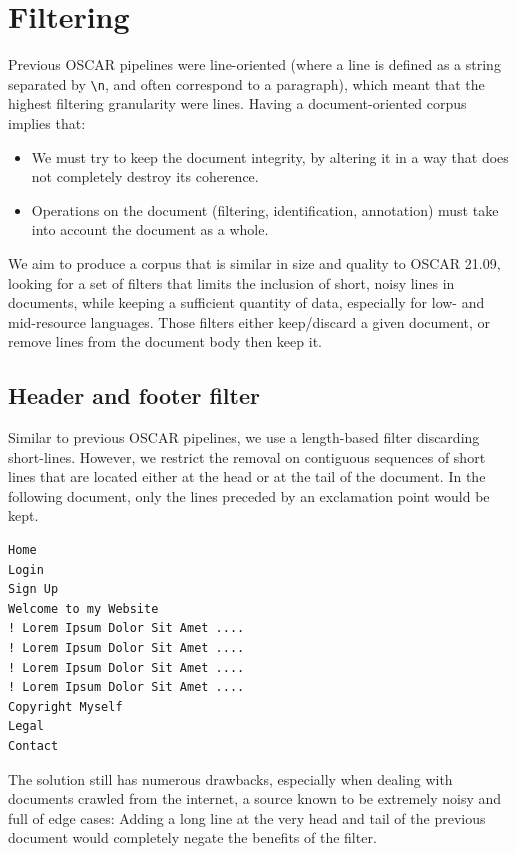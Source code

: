 \section{Filtering}

Previous OSCAR pipelines were line-oriented (where a line is defined as a string separated by \texttt{\textbackslash n}, and often correspond to a paragraph), which meant that the highest filtering granularity were lines.
Having a document-oriented corpus implies that:
\begin{itemize}
    \item We must try to keep the document integrity, by altering it in a way that does not completely destroy its coherence.
    \item Operations on the document (filtering, identification, annotation) must take into account the document as a whole.
\end{itemize}

We aim to produce a corpus that is similar in size and quality to OSCAR 21.09, looking for a set of filters that limits the inclusion of short, noisy lines in documents, while keeping a sufficient quantity of data, especially for low- and mid-resource languages. Those filters either keep/discard a given document, or remove lines from the document body then keep it.

\subsection {Header and footer filter}

Similar to previous OSCAR pipelines, we use a length-based filter discarding short-lines. However, we restrict the removal on contiguous sequences of short lines that are located either at the head or at the tail of the document. In the following document, only the lines preceded by an exclamation point would be kept.

\begin{verbatim}
Home
Login
Sign Up
Welcome to my Website
! Lorem Ipsum Dolor Sit Amet ....
! Lorem Ipsum Dolor Sit Amet ....
! Lorem Ipsum Dolor Sit Amet ....
! Lorem Ipsum Dolor Sit Amet ....
Copyright Myself
Legal
Contact
\end{verbatim}

The solution still has numerous drawbacks, especially when dealing with documents crawled from the internet, a source known to be extremely noisy and full of edge cases: Adding a long line at the very head and tail of the previous document would completely negate the benefits of the filter.

